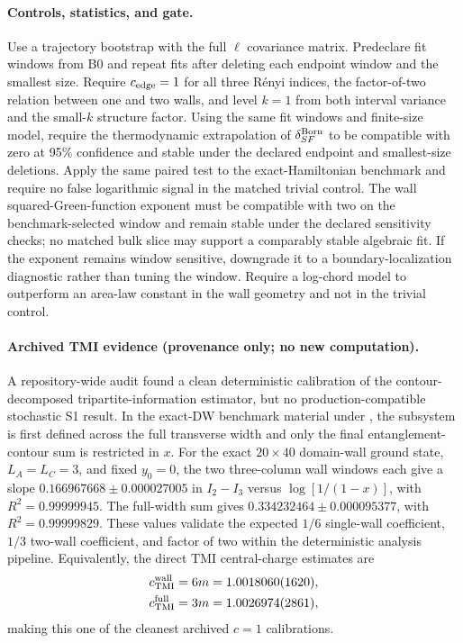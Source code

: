 \documentclass[aps,prx,twocolumn,floatfix,nofootinbib,superscriptaddress,longbibliography]{revtex4-2}
\begin{document}
\paragraph*{Controls, statistics, and gate.}
Use a trajectory bootstrap with the full $\ell$ covariance matrix.  Predeclare fit windows
from B0 and repeat fits after deleting each endpoint window and the smallest size.  Require
$c_{\rm edge}=1$ for all three R\'enyi indices, the factor-of-two relation between one and two
walls, and level $k=1$ from both interval variance and the small-$k$ structure factor.
Using the same fit windows and finite-size model, require the thermodynamic extrapolation
of $\delta_{SF}^{\rm Born}$ to be compatible with zero at 95\% confidence and stable under
the declared endpoint and smallest-size deletions.  Apply the same paired test to the
exact-Hamiltonian benchmark and require no false logarithmic signal in the matched trivial
control.  The wall squared-Green-function exponent must be compatible with two on the
benchmark-selected window and remain stable under the declared sensitivity checks; no
matched bulk slice may support a comparably stable algebraic fit.  If the exponent remains
window sensitive, downgrade it to a boundary-localization diagnostic rather than tuning
the window.  Require a log-chord model to outperform an area-law constant in the wall
geometry and not in the trivial control.

\paragraph*{Archived TMI evidence (provenance only; no new computation).}
A repository-wide audit found a clean deterministic calibration of the
contour-decomposed tripartite-information estimator, but no production-compatible
stochastic S1 result.  In the exact-DW benchmark material under
, the
subsystem is first defined across the full transverse width and only the final
entanglement-contour sum is restricted in $x$.
For the exact $20\times40$ domain-wall ground state, $L_A=L_C=3$, and fixed $y_0=0$,
the two three-column wall windows each give a slope
$0.166967668\pm0.000027005$ in $I_2-I_3$ versus
$\log[1/(1-x)]$, with $R^2=0.99999945$.  The full-width sum gives
$0.334232464\pm0.000095377$, with $R^2=0.99999829$.  These values validate the expected
$1/6$ single-wall coefficient, $1/3$ two-wall coefficient, and factor of two within the
deterministic analysis pipeline.  Equivalently, the direct TMI central-charge estimates
are
\begin{equation}
 \begin{aligned}
 c_{\rm TMI}^{\rm wall}&=6m=1.0018060(1620),\\
 c_{\rm TMI}^{\rm full}&=3m=1.0026974(2861),
 \end{aligned}
\end{equation}
making this one of the cleanest archived $c=1$ calibrations.
\end{document}

